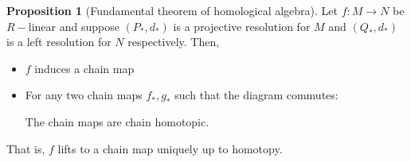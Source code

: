 \documentclass[12pt,reqno]{amsart}
\numberwithin{theorem}{section}
\theoremstyle{definition}
\theoremstyle{remark}
\numberwithin{equation}{section}
\theoremstyle{definition}
\newtheorem{prop}[theorem]{Proposition}
\begin{document}
\begin{prop}[Fundamental theorem of homological algebra]
    Let $f : M \rightarrow N$ be $R-$linear and suppose $(P_*,d_*)$ is a projective resolution for $M$ and $(Q_*,d_*)$ is a left resolution for $N$ respectively. Then, 
    \begin{itemize}
        \item $f$ induces a chain map
        \begin{center}
        \end{center}
        \item For any two chain maps $f_*,g_*$ such that the diagram commutes:
\begin{center}
\end{center}
        The chain maps are chain homotopic.
    \end{itemize}
\end{prop}
That is, $f$ lifts to a chain map uniquely up to homotopy.
\end{document}
